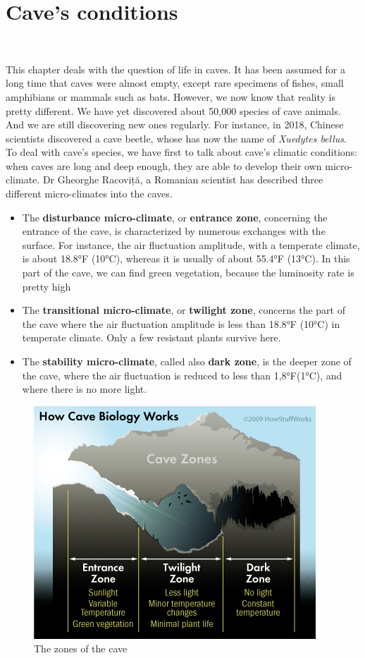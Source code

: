 \documentclass[draft, final]{report}
\begin{document}
\chapter{Cave’s conditions}
~\par
This chapter deals with the question of life in caves. It has been assumed for a long time that caves were almost empty, except rare specimens of fishes, small amphibians or mammals such as bats. However, we now know that reality is pretty different. We have yet discovered about 50,000 species of cave animals. And we are still discovering new ones regularly. For instance, in 2018, Chinese scientists discovered a cave beetle, whose has now the name of \emph{Xuedytes bellus}.
\smallbreak
To deal with cave’s species, we have first to talk about cave’s climatic conditions: when caves are long and deep enough, they are able to develop their own micro-climate. Dr Gheorghe Racoviță, a Romanian scientist has described three different micro-climates into the caves.

\begin{itemize}
  \item The \textbf{disturbance micro-climate}, or \textbf{entrance zone}, concerning the entrance of the cave, is characterized by numerous exchanges with the surface. For instance, the air fluctuation amplitude, with a temperate climate, is about 18.8°F (10°C), whereas it is usually of about 55.4°F (13°C). In this part of the cave, we can find green vegetation, because the luminosity rate is pretty high

  \item The \textbf{transitional micro-climate}, or \textbf{twilight zone}, concerns the part of the cave where the air fluctuation amplitude is less than 18.8°F (10°C) in temperate climate. Only a few resistant plants survive here.

  \item The \textbf{stability micro-climate}, called also \textbf{dark zone}, is the deeper zone of the cave, where the air fluctuation is reduced to less than 1,8°F(1°C), and where there is no more light.

\end{itemize}
\begin{figure}[!ht]
  \centering
  \includegraphics[scale=1]{LateX/Images/cavezones.png}
  \caption{The zones of the cave \cite{cavezones}}
  \label{CaveZones}
\end{figure}
\end{document}
